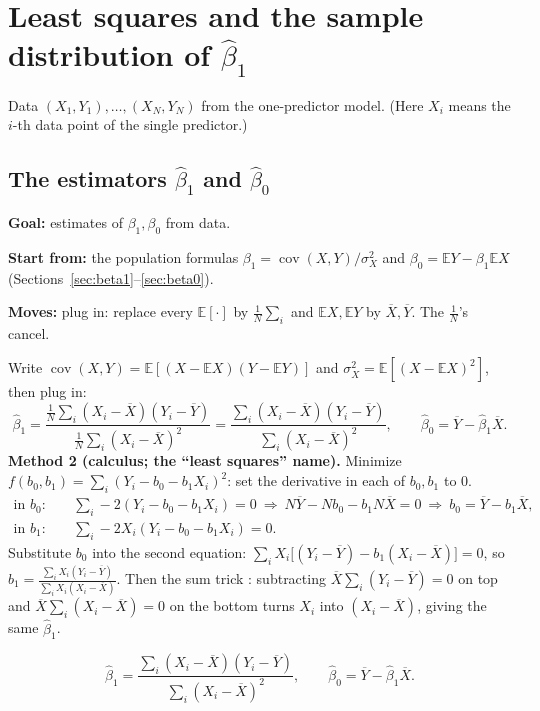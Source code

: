 \documentclass[11pt]{article}
\newcommand{\E}{\mathbb{E}}
\newcommand{\Cov}{\operatorname{cov}}
\newcommand{\Ybar}{\overline{Y}}
\newcommand{\Xbar}{\overline{X}}
\newcommand{\mv}[1]{\tcbox[on line, colback=methodclr, colframe=methodclr, coltext=white, boxsep=0pt,
  left=2pt, right=2pt, top=1pt, bottom=1pt, arc=1.5pt]{\sffamily\scriptsize\bfseries M#1}}
\newcommand{\goal}[1]{\textbf{Goal:} #1\par}
\newcommand{\start}[1]{\textbf{Start from:} #1\par}
\newcommand{\moves}[1]{\textbf{Moves:} #1\par}
\begin{document}
\clearpage
\section{Least squares and the sample distribution of $\hat\beta_1$}\label{sec:ls}
Data $(X_1,Y_1),\dots,(X_N,Y_N)$ from the one-predictor model. (Here $X_i$ means the $i$-th data point of the single predictor.)

\subsection{The estimators $\hat\beta_1$ and $\hat\beta_0$}\label{sec:lsest}
\begin{methodbox}
\goal{estimates of $\beta_1,\beta_0$ from data.}
\start{the population formulas $\beta_1=\Cov(X,Y)/\sigma_X^2$ and $\beta_0=\E Y-\beta_1\E X$ (Sections~\ref{sec:beta1}--\ref{sec:beta0}).}
\moves{\mv{8} plug in: replace every $\E[\cdot]$ by $\frac1N\sum_i$ and $\E X,\E Y$ by $\Xbar,\Ybar$. The $\frac1N$'s cancel.}
\end{methodbox}
Write $\Cov(X,Y)=\E[(X-\E X)(Y-\E Y)]$ and $\sigma_X^2=\E[(X-\E X)^2]$, then plug in:
\[
\hat\beta_1=\frac{\frac1N\sum_i(X_i-\Xbar)(Y_i-\Ybar)}{\frac1N\sum_i(X_i-\Xbar)^2}=\frac{\sum_i(X_i-\Xbar)(Y_i-\Ybar)}{\sum_i(X_i-\Xbar)^2},
\qquad \hat\beta_0=\Ybar-\hat\beta_1\Xbar .
\]
\textbf{Method 2 (calculus; the ``least squares'' name).} Minimize $f(b_0,b_1)=\sum_i(Y_i-b_0-b_1X_i)^2$: set the derivative in each of $b_0,b_1$ to $0$.
\begin{align*}
\text{in }b_0:\quad&\textstyle\sum_i-2(Y_i-b_0-b_1X_i)=0\ \Longrightarrow\ N\Ybar-Nb_0-b_1N\Xbar=0\ \Longrightarrow\ b_0=\Ybar-b_1\Xbar,\\
\text{in }b_1:\quad&\textstyle\sum_i-2X_i(Y_i-b_0-b_1X_i)=0 .
\end{align*}
Substitute $b_0$ into the second equation: $\sum_iX_i\big[(Y_i-\Ybar)-b_1(X_i-\Xbar)\big]=0$, so $b_1=\frac{\sum_iX_i(Y_i-\Ybar)}{\sum_iX_i(X_i-\Xbar)}$.
Then the sum trick \mv{11}: subtracting $\Xbar\sum_i(Y_i-\Ybar)=0$ on top and $\Xbar\sum_i(X_i-\Xbar)=0$ on the bottom turns $X_i$ into
$(X_i-\Xbar)$, giving the same $\hat\beta_1$.
\begin{keybox}
\[\hat\beta_1=\frac{\sum_i(X_i-\Xbar)(Y_i-\Ybar)}{\sum_i(X_i-\Xbar)^2},\qquad\hat\beta_0=\Ybar-\hat\beta_1\Xbar .\]
\end{keybox}
\end{document}
